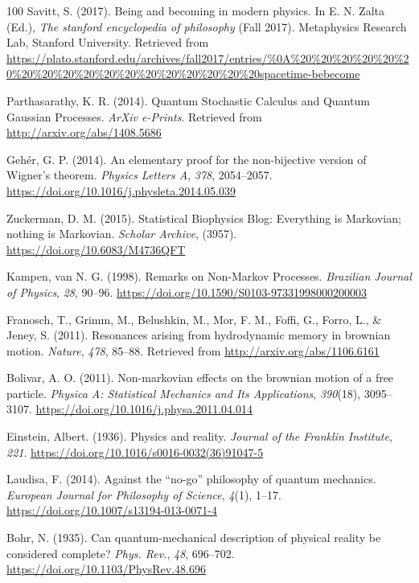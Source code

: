 \documentclass[11pt]{book}
\begin{document}
\begin{thebibliography}{100}
 Savitt, S. (2017). Being and becoming in modern physics. In E. N. Zalta
(Ed.), \emph{The stanford encyclopedia of philosophy} (Fall 2017).
Metaphysics Research Lab, Stanford University. Retrieved from
\url{https://plato.stanford.edu/archives/fall2017/entries/\%0A\%20\%20\%20\%20\%20\%20\%20\%20\%20\%20\%20\%20\%20\%20\%20\%20\%20\%20spacetime-bebecome}

 Parthasarathy, K. R. (2014). Quantum Stochastic Calculus and Quantum
Gaussian Processes. \emph{ArXiv e-Prints}. Retrieved from
\url{http://arxiv.org/abs/1408.5686}

 Gehér, G. P. (2014). An elementary proof for the non-bijective version
of Wigner's theorem. \emph{Physics Letters A}, \emph{378}, 2054--2057.
\url{https://doi.org/10.1016/j.physleta.2014.05.039}

 Zuckerman, D. M. (2015). Statistical Biophysics Blog: Everything is
Markovian; nothing is Markovian. \emph{Scholar Archive}, (3957).
\url{https://doi.org/10.6083/M4736QFT}

 Kampen, van N. G. (1998). Remarks on Non-Markov Processes.
\emph{{Brazilian Journal of Physics}}, \emph{28}, 90--96.
\url{https://doi.org/10.1590/S0103-97331998000200003}

 Franosch, T., Grimm, M., Belushkin, M., Mor, F. M., Foffi, G., Forro,
L., \& Jeney, S. (2011). Resonances arising from hydrodynamic memory in
brownian motion. \emph{Nature}, \emph{478}, 85--88. Retrieved from
\url{http://arxiv.org/abs/1106.6161}

 Bolivar, A. O. (2011). Non-markovian effects on the brownian motion of a
free particle. \emph{Physica A: Statistical Mechanics and Its
Applications}, \emph{390}(18), 3095--3107.
\url{https://doi.org/10.1016/j.physa.2011.04.014}

 Einstein, Albert. (1936). Physics and reality. \emph{Journal of the
Franklin Institute}, \emph{221}.
\url{https://doi.org/10.1016/s0016-0032(36)91047-5}

 Laudisa, F. (2014). Against the {``no-go''} philosophy of quantum
mechanics. \emph{European Journal for Philosophy of Science},
\emph{4}(1), 1--17. \url{https://doi.org/10.1007/s13194-013-0071-4}

 Bohr, N. (1935). Can quantum-mechanical description of physical reality
be considered complete? \emph{Phys. Rev.}, \emph{48}, 696--702.
\url{https://doi.org/10.1103/PhysRev.48.696}


\end{thebibliography}
\end{document}
